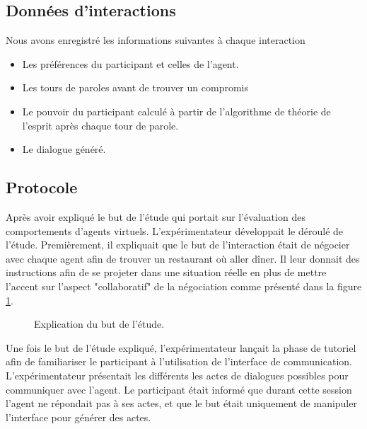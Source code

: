 		  \subsection{Données d'interactions}
		  Nous avons enregistré les informations suivantes à chaque interaction
		  \begin{itemize}
		  	\item Les préférences du participant et celles de l'agent.
		  	\item Les tours de paroles avant de trouver un compromis
		  	\item Le pouvoir du participant calculé à partir de l'algorithme de théorie de l'esprit après chaque tour de parole.
		  	\item Le dialogue généré.
		  	
		  \end{itemize}


	\subsection{Protocole}
		Après avoir expliqué le but de l'étude qui portait sur l'évaluation des comportements d'agents virtuels. L'expérimentateur développait le déroulé de l'étude. 
		Premièrement, il expliquait que le but de l'interaction était de négocier avec chaque agent afin de trouver un restaurant où aller dîner. Il leur donnait des instructions afin de se projeter dans une situation réelle en plus de mettre l'accent sur l'aspect "collaboratif" de la négociation comme présenté dans la figure \ref{fig:instruction}.
		
		\begin{figure}[h]
				
				\caption{\label{fig:instruction}Explication du but de l'étude.}
			\end{figure}


		Une fois le but de l'étude expliqué, l'expérimentateur lançait la phase de tutoriel afin de familiariser le participant à l'utilisation de l'interface de communication. 	L'expérimentateur présentait les différents les actes de dialogues possibles pour communiquer avec l'agent. 	
		Le participant était informé que durant cette session l'agent ne répondait pas à ses actes, et que le but était uniquement de manipuler l'interface pour générer des actes. 
	
